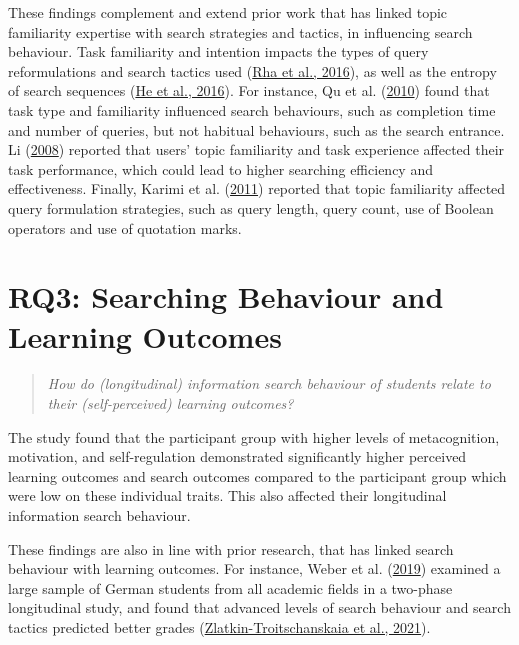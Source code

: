 \documentclass[letterpaper, nobind]{templates/ociamthesis}
\begin{document}
These findings complement and extend prior work that has linked topic familiarity expertise with search strategies and tactics, in influencing search behaviour.
Task familiarity and intention impacts the types of query reformulations and search tactics used (\protect\hyperlink{ref-rha2016exploring}{Rha et al., 2016}), as well as the entropy of search sequences (\protect\hyperlink{ref-he2016beyond}{He et al., 2016}).
For instance, Qu et al. (\protect\hyperlink{ref-qu2010effect}{2010}) found that task type and familiarity influenced search behaviours, such as completion time and number of queries, but not habitual behaviours, such as the search entrance.
Li (\protect\hyperlink{ref-li2008relationships}{2008}) reported that users' topic familiarity and task experience affected their task performance, which could lead to higher searching efficiency and effectiveness.
Finally, Karimi et al. (\protect\hyperlink{ref-karimi2011domain}{2011}) reported that topic familiarity affected query formulation strategies, such as query length, query count, use of Boolean operators and use of quotation marks.

\hypertarget{rq3-searching-behaviour-and-learning-outcomes}{%
\section{RQ3: Searching Behaviour and Learning Outcomes}\label{rq3-searching-behaviour-and-learning-outcomes}}

\begin{quote}
\emph{How do (longitudinal) information search behaviour of students relate to their (self-perceived) learning outcomes?}
\end{quote}

The study found that the participant group with higher levels of metacognition, motivation, and self-regulation demonstrated significantly higher perceived learning outcomes and search outcomes compared to the participant group which were low on these individual traits.
This also affected their longitudinal information search behaviour.

These findings are also in line with prior research, that has linked search behaviour with learning outcomes.
For instance, Weber et al. (\protect\hyperlink{ref-weber2019informationseeking}{2019}) examined a large sample of German students from all academic fields in a two-phase longitudinal study, and found that advanced levels of search behaviour and search tactics predicted better grades (\protect\hyperlink{ref-zlatkin2021students}{Zlatkin-Troitschanskaia et al., 2021}).
\end{document}
